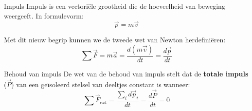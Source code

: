 \begin{theo}[Impuls]{Impuls}
    Impuls is een vectoriële grootheid die de hoeveelheid van beweging weergeeft. In formulevorm: 
        \begin{equation*}
            \Vec{p} = m\Vec{v}
        \end{equation*}
        
    \noindent Met dit nieuw begrip kunnen we de tweede wet van Newton herdefiniëren:
    \begin{equation*}
        \sum \Vec{F} = m\Vec{a} = \dfrac{d(m\Vec{v})}{dt} = \dfrac{d\Vec{p}}{dt}
    \end{equation*}

    \vspace{-0.3cm}

\end{theo}

\begin{lem}{Behoud van impuls}
    De wet van de behoud van impuls stelt dat de \textbf{totale impuls} ($ \Vec{P} $) van een geïsoleerd stelsel van deeltjes constant is wanneer: 
    \begin{equation*}
         \sum \Vec{F}_{ext} = \dfrac{\sum_i d\Vec{p}_i}{dt} = \dfrac{d\Vec{P}}{dt} = 0
    \end{equation*} 

    \vspace{-0.3cm}
\end{lem}

